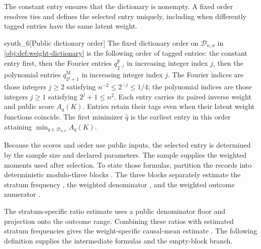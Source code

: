 The constant entry ensures that the dictionary is nonempty. A fixed order resolves ties and defines the selected entry  uniquely, including when differently tagged entries have the same latent weight.

\begin{definitionv}{synth_6}[Public dictionary order]
The fixed dictionary order on \(\mathcal D_{n,\sigma}\) in \cref{obj:def:weight-dictionary} is the following order of tagged entries: the constant entry first, then the Fourier entries \(q_{2^{-j}}^{\mathrm F}\) in increasing integer index \(j\), then the polynomial entries \(q_{2^j+1}^{\mathrm M}\) in increasing integer index \(j\). The Fourier indices are those integers \(j\ge2\) satisfying \(n^{-2}\le2^{-j}\le1/4\); the polynomial indices are those integers \(j\ge1\) satisfying \(2^j+1\le n^2\). Each entry carries its paired inverse weight and public score \(A_q(K)\). Entries retain their tags even when their latent weight functions coincide. The first minimizer \(\widehat q\) is the earliest entry in this order attaining \(\min_{q\in\mathcal D_{n,\sigma}}A_q(K)\).
\end{definitionv}

Because the scores and order use public inputs, the selected entry is determined by the sample size and declared parameters. The sample supplies the weighted moments used after selection. To state those formulas, partition the records into deterministic modulo-three blocks . The three blocks separately estimate the stratum frequency , the weighted denominator , and the weighted outcome numerator .

The stratum-specific ratio estimate  uses a public denominator floor and projection onto the outcome range. Combining these ratios with estimated stratum frequencies gives the weight-specific causal-mean estimate . The following definition supplies the intermediate formulas and the empty-block branch.

